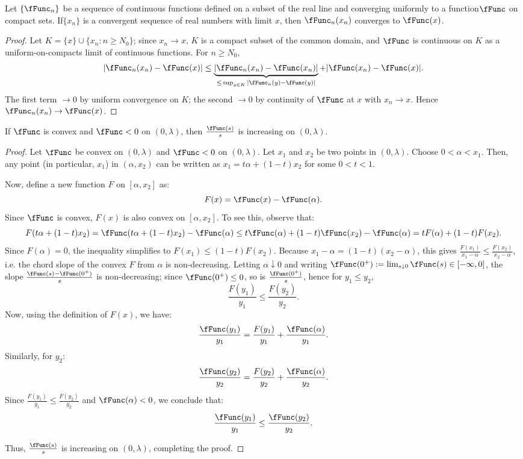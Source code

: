\documentclass[\econtexRoot/BufferStockTheory]{subfiles}
\begin{document}
\begin{fact}\label{fact:compactnt}
Let $\{\fFunc_n\}$ be a sequence of continuous functions defined on a subset of the real line and converging uniformly to a function$\fFunc$ on compact sets.
If$\{x_n\}$ is a convergent sequence of real numbers with limit $x$, then $\fFunc_n(x_n)$ converges to $\fFunc(x)$.
\end{fact}

\begin{proof}
Let $K=\{x\}\cup\{x_n:n\geq N_0\}$; since $x_n\to x$, $K$ is a compact subset of the common domain, and $\fFunc$ is continuous on $K$ as a uniform-on-compacts limit of continuous functions. For $n\geq N_0$,
\[
|\fFunc_n(x_n)-\fFunc(x)| \leq \underbrace{|\fFunc_n(x_n)-\fFunc(x_n)|}_{\leq\,\sup_{y\in K}|\fFunc_n(y)-\fFunc(y)|} + |\fFunc(x_n)-\fFunc(x)|.
\]
The first term $\to 0$ by uniform convergence on $K$; the second $\to 0$ by continuity of $\fFunc$ at $x$ with $x_n\to x$. Hence $\fFunc_n(x_n)\to\fFunc(x)$.
\end{proof}


\begin{claim}\label{claim:rationondec}
If $\fFunc$ is convex and $\fFunc < 0$ on $(0, \lambda)$, then $\frac{\fFunc(s)}{s}$ is increasing on $(0, \lambda)$.
\end{claim}

\begin{proof}
Let $\fFunc$ be convex on $(0, \lambda)$ and $\fFunc < 0$ on $(0, \lambda)$.
Let $x_1$ and $x_2$ be two points in $(0, \lambda)$.
Choose $0 < \alpha < x_1$.
Then, any point (in particular, $x_1$) in $(\alpha, x_2)$ can be written as $x_1 = t \alpha + (1 - t) x_2$ for some $0 < t < 1$.

Now, define a new function $F$ on $[\alpha, x_2]$ as:
\[
F(x) = \fFunc(x) - \fFunc(\alpha).
\]
Since $\fFunc$ is convex, $F(x)$ is also convex on $[\alpha, x_2]$.
To see this, observe that:
\[
F(t\alpha + (1-t)x_2) = \fFunc(t\alpha + (1-t)x_2) - \fFunc(\alpha) \leq t \fFunc(\alpha) + (1-t) \fFunc(x_2) - \fFunc(\alpha) = t F(\alpha) + (1-t) F(x_2).
\]
Since $F(\alpha) = 0$, the inequality simplifies to $F(x_1) \leq (1-t) F(x_2)$.
Because $x_1-\alpha=(1-t)(x_2-\alpha)$, this gives $\frac{F(x_1)}{x_1-\alpha}\leq\frac{F(x_2)}{x_2-\alpha}$, i.e. the chord slope of the convex $F$ from $\alpha$ is non-decreasing. Letting $\alpha\downarrow 0$ and writing $\fFunc(0^{+}):=\lim_{s\downarrow 0}\fFunc(s)\in[-\infty,0]$, the slope $\frac{\fFunc(s)-\fFunc(0^{+})}{s}$ is non-decreasing; since $\fFunc(0^{+})\leq 0$, so is $\frac{\fFunc(0^{+})}{s}$, hence for $y_1\leq y_2$,
\[
\frac{F(y_1)}{y_1} \leq \frac{F(y_2)}{y_2}.
\]
Now, using the definition of $F(x)$, we have:
\[
\frac{\fFunc(y_1)}{y_1} = \frac{F(y_1)}{y_1} + \frac{\fFunc(\alpha)}{y_1}.
\]
Similarly, for $y_2$:
\[
\frac{\fFunc(y_2)}{y_2} = \frac{F(y_2)}{y_2} + \frac{\fFunc(\alpha)}{y_2}.
\]
Since $\frac{F(y_1)}{y_1} \leq \frac{F(y_2)}{y_2}$ and $\fFunc(\alpha) < 0$, we conclude that:
\[
\frac{\fFunc(y_1)}{y_1} \leq  \frac{\fFunc(y_2)}{y_2}.
\]

Thus, $\frac{\fFunc(s)}{s}$ is increasing on $(0, \lambda)$, completing the proof.
\end{proof}
\end{document}
